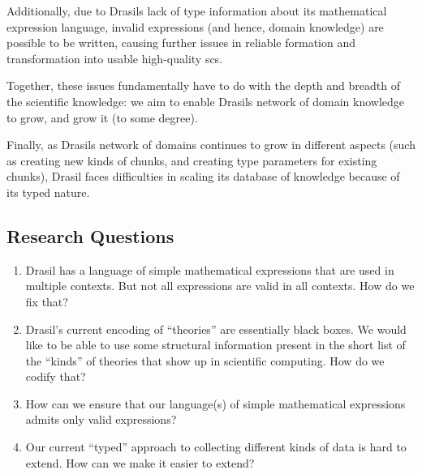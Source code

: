 Additionally, due to Drasils lack of type information about its mathematical
expression language, invalid expressions (and hence, domain knowledge) are
possible to be written, causing further issues in reliable formation and
transformation into usable high-quality \acs{scs}.

Together, these issues fundamentally have to do with the depth and breadth of
the scientific knowledge: we aim to enable Drasils network of domain knowledge
to grow, and grow it (to some degree).

Finally, as Drasils network of domains continues to grow in different aspects
(such as creating new kinds of chunks, and creating type parameters for existing
chunks), Drasil faces difficulties in scaling its database of knowledge because
of its typed nature.

\subsection{Research Questions}
\label{sec:intro:researchquestions}



\begin{enumerate}

      \item[\namedlabel{rq:lang_division}{RQ1}] Drasil has a language of simple
            mathematical expressions that are used in multiple contexts. But not
            all expressions are valid in all contexts. How do we fix that?

      \item[\namedlabel{rq:modelkinds}{RQ2}] Drasil's current encoding of
            ``theories'' are essentially black boxes. We would like to be able
            to use some structural information present in the short list of the
            ``kinds'' of theories that show up in scientific computing. How do
            we codify that?

      \item[\namedlabel{rq:typing}{RQ3}] How can we ensure that our language(s)
            of simple mathematical expressions admits only valid expressions?

      \item[\namedlabel{rq:chunkdb}{RQ4}] Our current ``typed'' approach to
            collecting different kinds of data is hard to extend. How can we
            make it easier to extend?

\end{enumerate}

